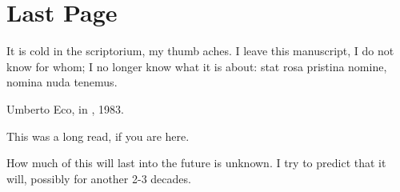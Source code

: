\chapter{Last Page}

\epigraph{It is cold in the scriptorium, my thumb aches. I leave this manuscript, I do not know for whom; I no
longer know what it is about: stat rosa pristina nomine, nomina nuda tenemus.}{Umberto Eco, in , 1983. }

This was a long read, if you are here. 

How much of this will last into the future is unknown. I try to predict that it will, possibly for another 2-3 decades. 
